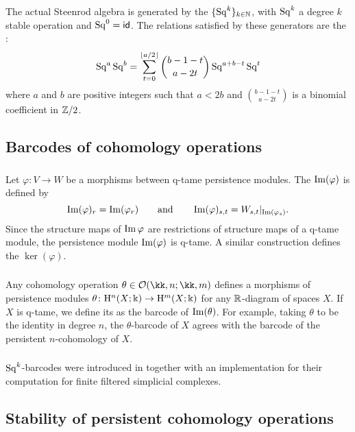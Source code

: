 The actual Steenrod algebra is generated by the  $\{\operatorname{Sq}^k\}_{k \in \mathbb{N}}$, with $\operatorname{Sq}^k$ a degree $k$ stable operation and $\operatorname{Sq}^0 = \mathsf{id}$.
The relations satisfied by these generators are the :
\[
\operatorname{Sq}^a \operatorname{Sq}^b = \sum_{t = 0}^{\lfloor a/2 \rfloor} \binom{b-1-t}{a-2t} \operatorname{Sq}^{a+b-t} \operatorname{Sq}^t
\]
where $a$ and $b$ are positive integers such that $a < 2b$ and \(\binom{b-1-t}{a-2t}\) is a binomial coefficient in $\mathbb{Z}/2$.


\subsection{Barcodes of cohomology operations}

\subsubsection{} Let $\varphi \colon V \to W$ be a morphisms between q-tame persistence modules.
The  $\operatorname{Im}(\varphi)$ is defined by
\[
\operatorname{Im}(\varphi)_r = \operatorname{Im}(\varphi_r)
\qquad\text{and}\qquad
\operatorname{Im}(\varphi)_{s,t} = W_{s,t}|_{\operatorname{Im}(\varphi_s)}.
\]
Since the structure maps of $\operatorname{Im} \varphi$ are restrictions of structure maps of a q-tame module, the persistence module $\operatorname{Im}(\varphi)$ is q-tame.
A similar construction defines the  $\ker(\varphi)$.

\subsubsection{} Any cohomology operation $\theta \in \cO(\kk,n; \kk,m)$ defines a morphisms of persistence modules $\theta \colon \mathrm{H}^n(X; \Bbbk) \to \mathrm{H}^m(X; \Bbbk)$ for any $\mathbb{R}$-diagram of spaces $X$.
If $X$ is q-tame, we define its  as the barcode of $\operatorname{Im}(\theta)$.
For example, taking $\theta$ to be the identity in degree $n$, the $\theta$-barcode of $X$ agrees with the barcode of the persistent $n$-cohomology of $X$.

\subsubsection{} $\operatorname{Sq}^k$-barcodes were introduced in \cite{medina2022per_st} together with an implementation for their computation for finite filtered simplicial complexes.

\subsection{Stability of persistent cohomology operations}\label{ss:stability}

